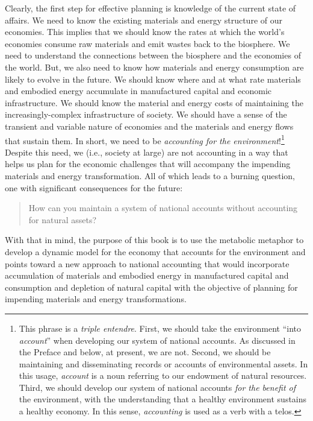 Clearly, the first step for effective planning 
is knowledge of the current state of affairs.
We need to know the existing materials and energy structure of our economies. 
This implies that we should know the rates at which 
the world's economies consume raw materials and emit wastes back to the biosphere.
We need to understand the connections between the biosphere and the economies of the world.
But, we also need to know how materials and energy consumption 
are likely to evolve in the future.
We should know where and at what rate 
materials and embodied energy accumulate 
in manufactured capital and economic infrastructure. 
We should know the material and energy costs of maintaining the
increasingly-complex infrastructure of society.
We should have a sense of the transient and variable nature of economies
and the materials and energy flows that sustain them.
In short, we need to be \emph{accounting for the environment}!\footnote{This phrase 
	is a \emph{triple entendre}.
	First, we should take the environment ``into \emph{account}''
		when developing our system of national accounts.
		As discussed in the Preface and below, at present, we are not.
	Second, we should be maintaining and disseminating
		records or accounts of environmental assets. 
		In this usage, \emph{account} is a noun
		referring to our endowment of natural resources.
	Third, we should develop our system of national accounts 
		\emph{for the benefit of} the environment, 
		with the understanding 
		that a healthy environment sustains a healthy economy.
		In this sense, \emph{accounting} is used as a verb with a telos.
}
Despite this need, we (i.e., society at large) 
are not accounting in a way that helps us plan 
for the economic challenges that will accompany 
the impending materials and energy transformation.
All of which leads to a burning question,
one with significant consequences for the future:

\begin{quote}
{\normalsize{How can you maintain a system of national accounts without 
accounting for natural assets?}}
\end{quote}

\noindent{}With that in mind, the purpose of this book is to 
use the metabolic metaphor 
to develop a dynamic model for the economy 
that accounts for the environment
and points toward a new approach to national accounting 
that would incorporate accumulation of materials and embodied energy in manufactured capital 
and consumption and depletion of natural capital
with the objective of planning 
for impending materials and energy transformations.



